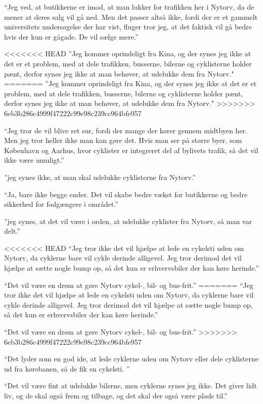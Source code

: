 \begin{appendics}
“Jeg ved, at butikkerne er imod, at man lukker for trafikken her i Nytorv, da de mener at deres salg vil gå ned. Men det passer altså ikke, fordi der er et gammelt universitets undersøgelse der har vist, fluger tror jeg, at det faktisk vil gå bedre hvis der kun er gågade. De vil sælge mere.”

<<<<<<< HEAD
”Jeg kommer oprindeligt fra Kina, og der synes jeg ikke at det er et problem, med at dele trafikken, busserne, bilerne og cyklisterne holder pænt, derfor synes jeg ikke at man behøver, at udelukke dem fra Nytorv."
=======
”Jeg kommer oprindeligt fra Kina, og der synes jeg ikke at det er et problem, med at dele trafikken, busserne, bilerne og cyklisterne holder pænt, derfor synes jeg ikke at man behøver, at udelukke dem fra Nytorv." 
>>>>>>> 6eb3b286c4999f47222c99e98c239cc964bfe957

“Jeg tror de vil blive ret sur, fordi der mange der kører gennem midtbyen her. Men jeg tror heller ikke man kan gøre det. Hvis man ser på større byer, som København og Aarhus, hvor cyklister er integreret del af bylivets trafik, så det vil ikke være umuligt.”

”jeg synes ikke, at man skal udelukke cyklisterne fra Nytorv.”

“Ja, bare ikke begge ender. Det vil skabe bedre vækst for butikkerne og bedre sikkerhed for fodgængere i området.”

”jeg synes, at det vil være i orden, at udelukke cyklister fra Nytorv, så man var delt.”

<<<<<<< HEAD
“Jeg tror ikke det vil hjælpe at lede en cykelsti uden om Nytorv, da cyklerne bare vil cykle derinde alligevel. Jeg tror derimod det vil hjælpe at sætte nogle bump op, så det kun er erhvervsbiler der kan køre herinde.”

“Det vil være en drøm at gøre Nytorv cykel-, bil- og bus-frit.”
=======
“Jeg tror ikke det vil hjælpe at lede en cykelsti uden om Nytorv, da cyklerne bare vil cykle derinde alligevel. Jeg tror derimod det vil hjælpe at sætte nogle bump op, så det kun er erhvervsbiler der kan køre herinde.” 

“Det vil være en drøm at gøre Nytorv cykel-, bil- og bus-frit.” 
>>>>>>> 6eb3b286c4999f47222c99e98c239cc964bfe957

“Det lyder som en god ide, at lede cyklerne uden om Nytorv eller dele cyklisterne ud fra kørebanen, så de fik en cykelsti. ”

“Det vil være fint at udelukke bilerne, men cyklerne synes jeg ikke. Det giver lidt liv, og de skal også frem og tilbage, og det skal der også være plads til.”


\end{appendics}
